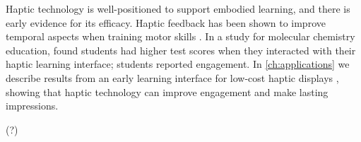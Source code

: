 Haptic technology is well-positioned to support embodied learning, and there is early evidence for its efficacy.
Haptic feedback has been shown to improve temporal aspects when training motor skills \cite{Feygin2002}.
In a study for molecular chemistry education, \citet{Sato2008} found students had higher test scores when they interacted with their haptic learning interface; students reported engagement.
In \autoref{ch:applications} we describe results from an early learning interface for low-cost haptic displays \cite{Martinez2016}, showing that haptic technology can improve engagement and make lasting impressions.

\cite{Hook2008bodyemotion} (?)


